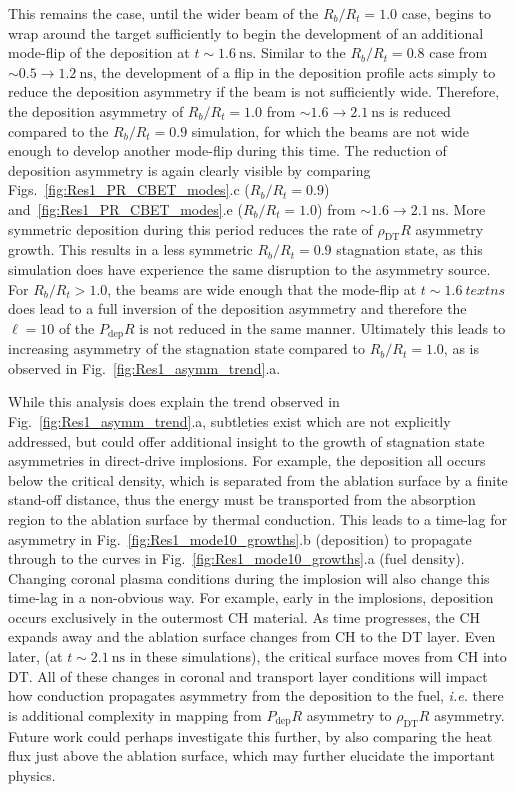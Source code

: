This remains the case, until the wider beam of the $R_b/R_t=1.0$ case, begins to wrap around the target sufficiently to begin the development of an additional mode-flip of the deposition at $t\sim1.6\ \text{ns}$.
Similar to the $R_b/R_t=0.8$ case from $\sim0.5\rightarrow1.2\ \text{ns}$, the development of a flip in the deposition profile acts simply to reduce the deposition asymmetry if the beam is not sufficiently wide.
Therefore, the deposition asymmetry of $R_b/R_t=1.0$ from $\sim1.6\rightarrow2.1\ \text{ns}$ is reduced compared to the $R_b/R_t=0.9$ simulation, for which the beams are not wide enough to develop another mode-flip during this time.
The reduction of deposition asymmetry is again clearly visible by comparing Figs.~\ref{fig:Res1_PR_CBET_modes}.c ($R_b/R_t=0.9$) and~\ref{fig:Res1_PR_CBET_modes}.e ($R_b/R_t=1.0$) from $\sim1.6\rightarrow2.1\ \text{ns}$.
More symmetric deposition during this period reduces the rate of $\rho_{\text{DT}}R$ asymmetry growth.
This results in a less symmetric $R_b/R_t=0.9$ stagnation state, as this simulation does have experience the same disruption to the asymmetry source.
For $R_b/R_t>1.0$, the beams are wide enough that the mode-flip at $t\sim1.6\ text{ns}$ does lead to a full inversion of the deposition asymmetry and therefore the $\ell=10$ of the $P_{\text{dep}}R$ is not reduced in the same manner.
Ultimately this leads to increasing asymmetry of the stagnation state compared to $R_b/R_t=1.0$, as is observed in Fig.~\ref{fig:Res1_asymm_trend}.a.

While this analysis does explain the trend observed in Fig.~\ref{fig:Res1_asymm_trend}.a, subtleties exist which are not explicitly addressed, but could offer additional insight to the growth of stagnation state asymmetries in direct-drive implosions.
For example, the deposition all occurs below the critical density, which is separated from the ablation surface by a finite stand-off distance, thus the energy must be transported from the absorption region to the ablation surface by thermal conduction.
This leads to a time-lag for asymmetry in Fig.~\ref{fig:Res1_mode10_growths}.b (deposition) to propagate through to the curves in Fig.~\ref{fig:Res1_mode10_growths}.a (fuel density).
Changing coronal plasma conditions during the implosion will also change this time-lag in a non-obvious way.
For example, early in the implosions, deposition occurs exclusively in the outermost CH material.
As time progresses, the CH expands away and the ablation surface changes from CH to the DT layer.
Even later, (at $t\sim2.1\ \text{ns}$ in these simulations), the critical surface moves from CH into DT.
All of these changes in coronal and transport layer conditions will impact how conduction propagates asymmetry from the deposition to the fuel, \textit{i.e.} there is additional complexity in mapping from $P_{\text{dep}}R$ asymmetry to $\rho_{\text{DT}}R$ asymmetry.
Future work could perhaps investigate this further, by also comparing the heat flux just above the ablation surface, which may further elucidate the important physics.

